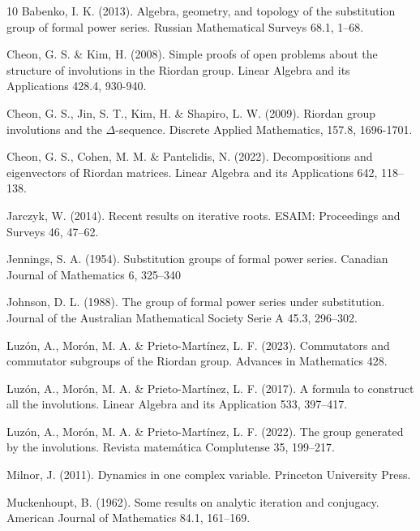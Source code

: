 \documentclass[preprint,12pt]{elsarticle}
\begin{document}
\begin{thebibliography}{10}
 Babenko, I. K. (2013). Algebra, geometry, and topology of the substitution group of formal power series. Russian Mathematical Surveys 68.1, 1--68.

 Cheon, G. S. \& Kim, H. (2008). Simple proofs of open problems about the structure of involutions in the Riordan group. Linear Algebra and its Applications 428.4, 930-940.

 Cheon, G. S., Jin, S. T., Kim, H. \&  Shapiro, L. W. (2009). Riordan group involutions and the $\Delta$-sequence. Discrete Applied Mathematics, 157.8, 1696-1701.

 Cheon, G. S., Cohen, M. M. \&  Pantelidis, N. (2022). Decompositions and eigenvectors of Riordan matrices. Linear Algebra and its Applications 642, 118--138.


 Jarczyk, W. (2014). Recent results on iterative roots. ESAIM: Proceedings and Surveys 46, 47--62.


  Jennings, S. A.  (1954). Substitution groups of formal power series. Canadian Journal of Mathematics 6, 325--340



  Johnson, D. L. (1988). The group of formal power series under substitution. Journal of the Australian
Mathematical Society Serie A 45.3, 296--302.

 Luzón, A., Morón, M. A. \& Prieto-Martínez, L. F. (2023). Commutators and commutator subgroups of the Riordan group. Advances in Mathematics 428.



 Luzón, A., Morón, M. A. \& Prieto-Martínez, L. F. (2017). A formula to construct all the involutions. Linear Algebra and its Application 533, 397--417.


 Luzón, A.,  Morón, M. A. \& Prieto-Martínez, L. F. (2022). The group generated by the involutions. Revista matemática Complutense 35, 199--217.




 Milnor, J. (2011). Dynamics in one complex variable. Princeton University Press.


 Muckenhoupt, B. (1962). Some results on analytic iteration and conjugacy. American Journal of Mathematics 84.1, 161--169.


\end{thebibliography}
\end{document}

